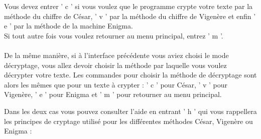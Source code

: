 \documentclass[a4paper,12pt,abstracton,titlepage]{scrartcl}
\begin{document}
Vous devez entrer ' c ' si vous voulez que le programme crypte votre texte par la méthode du chiffre de César, ' v ' par la méthode du chiffre de Vigenère et enfin ' e ' par la méthode de la machine Enigma.\\
Si tout autre fois vous voulez retourner au menu principal, entrez ' m '.\\
\\
De la même manière, si à l'interface précédente vous aviez choisi le mode décryptage, vous allez devoir choisir la méthode par laquelle vous voulez décrypter votre texte. Les commandes pour choisir la méthode de décryptage sont alors les mêmes que pour un texte à crypter : ' c ' pour César, ' v ' pour Vigenère, ' e ' pour Enigma et ' m ' pour retourner au menu principal.

\vspace{0.5cm}
{
\label{FD}
}
\vspace{0.5cm}

Dans les deux cas vous pouvez consulter l'aide en entrant ' h ' qui vous rappellera les principes de cryptage utilisé pour les différentes méthodes César, Vigenère ou Enigma :

\vspace{0.5cm}
{
\label{FHM}
}
\vspace{1cm}
\end{document}
